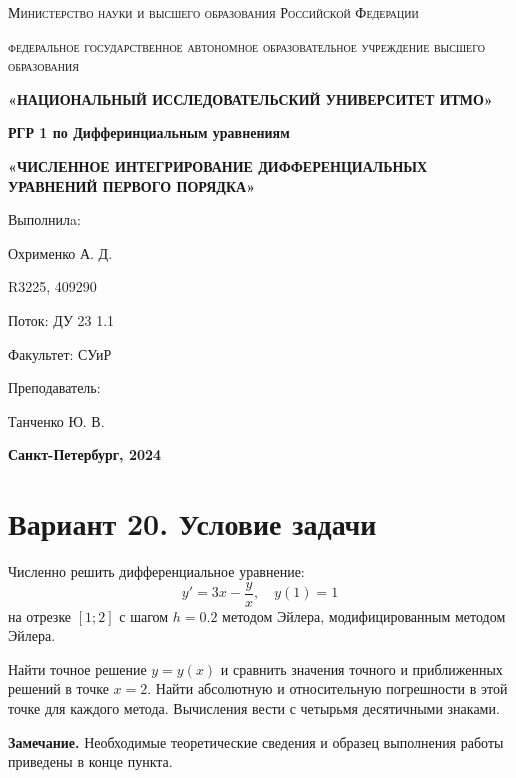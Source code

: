 \documentclass[a4paper,12pt]{article}
\begin{document}
\begin{titlepage}
    \centering
    {\scshape\large Министерство науки и высшего образования Российской Федерации\par}
    {\scshape\large федеральное государственное автономное образовательное учреждение высшего образования\par}
    {\bfseries\large «НАЦИОНАЛЬНЫЙ ИССЛЕДОВАТЕЛЬСКИЙ УНИВЕРСИТЕТ ИТМО»\par}
    \vspace{3cm}
    {\bfseries\Large РГР 1 по Дифферинциальным уравнениям\par}
    \vspace{1cm}
    {\bfseries\large «ЧИСЛЕННОЕ
ИНТЕГРИРОВАНИЕ
ДИФФЕРЕНЦИАЛЬНЫХ
УРАВНЕНИЙ ПЕРВОГО
ПОРЯДКА»\par}
    \vfill
    \hspace{0.5\linewidth}%
    \begin{minipage}{0.4\linewidth}
        Выполнилa: \par Охрименко А. Д. \par
        R3225, 409290 \par
        Поток: ДУ 23 1.1 \par
        Факультет: СУиР \par
        Преподаватель: \par
        Танченко Ю. В.
    \end{minipage}
    \vfill
    {\bfseries Санкт-Петербург, 2024\par}
\end{titlepage}






\section{Вариант 20. Условие задачи}

Численно решить дифференциальное уравнение:
\[
y' = 3x - \frac{y}{x}, \quad y(1) = 1
\]
на отрезке $[1; 2]$ с шагом $h = 0.2$ методом Эйлера, модифицированным методом Эйлера.

Найти точное решение $y = y(x)$ и сравнить значения точного и приближенных решений в точке $x = 2$. Найти абсолютную и относительную погрешности в этой точке для каждого метода. Вычисления вести с четырьмя десятичными знаками.

\textbf{Замечание.} Необходимые теоретические сведения и образец выполнения работы приведены в конце пункта.
\end{document}

